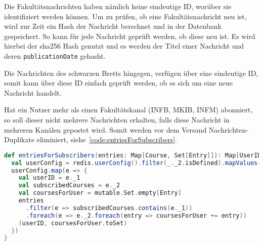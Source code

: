 Die Fakultätsnachrichten haben nämlich keine eindeutige ID, worüber sie identifiziert werden können. Um zu prüfen, ob eine Fakultätsnachricht neu ist, wird zur Zeit ein Hash der Nachricht berechnet und in der Datenbank gespeichert. So kann für jede Nachricht geprüft werden, ob diese neu ist. Es wird hierbei der sha256 Hash genutzt und es werden der Titel einer Nachricht und deren \texttt{publicationDate} gehasht.

Die Nachrichten des schwarzen Bretts hingegen, verfügen über eine eindeutige ID, somit kann über diese ID einfach geprüft werden, ob es sich um eine neue Nachricht handelt.

Hat ein Nutzer mehr als einen Fakultätskanal (INFB, MKIB, INFM) abonniert, so soll dieser nicht mehrere Nachrichten erhalten, falls diese Nachricht in mehreren Kanälen gepostet wird. Somit werden vor dem Versand Nachrichten-Duplikate eliminiert, siehe~\autoref{code:entriesForSubscribers}.

\begin{lstlisting}[language=scala, style=scala, caption={Verteilung der Nachrichten auf die Subscriber und Eliminierung von Duplikaten}, label={code:entriesForSubscribers}]
def entriesForSubscribers(entries: Map[Course, Set[Entry]]): Map[UserID, Set[Entry]] = {
  val userConfig = redis.userConfig().filter(_._2.isDefined).mapValues(_.get)
  userConfig.map(e => {
    val userID = e._1
    val subscribedCourses = e._2
    val coursesForUser = mutable.Set.empty[Entry]
    entries
      .filter(e => subscribedCourses.contains(e._1))
      .foreach(e => e._2.foreach(entry => coursesForUser += entry))
    (userID, coursesForUser.toSet)
  })
}
\end{lstlisting}
